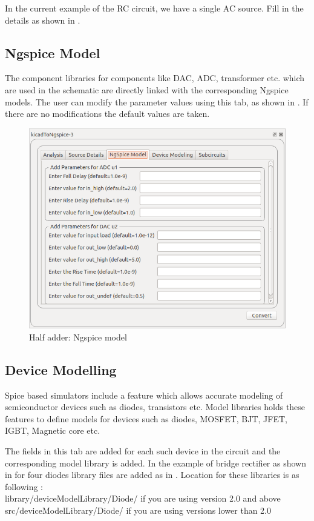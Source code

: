In the current example of the RC circuit, we have a single AC source. Fill in the details as shown in .

\subsection {Ngspice Model} \label{ngspicemodel}
The component libraries for components like DAC, ADC, transformer etc. which are used in the schematic are directly linked with the corresponding Ngspice models. The user can modify the parameter values using this tab, as shown in . If there are no modifications the default values are taken.

\begin{figure}
\centering
\includegraphics[width=\lgfig]{manual_images/ngspice-model.png}
\caption{Half adder: Ngspice model}
\label{ngspicemodel}
\end{figure}

\subsection {Device Modelling} \label{devicemodel}
Spice based simulators include a feature which allows accurate modeling of semiconductor devices such as diodes, transistors etc. Model libraries holds these features to define models for devices such as diodes, MOSFET, BJT, JFET, IGBT, Magnetic core etc.

The fields in this tab are added for each such device in the circuit and the corresponding model library is added. In the example of bridge rectifier as shown in  for four diodes library files are added as in . Location for these libraries is as following : \\
library/deviceModelLibrary/Diode/ if you are using version 2.0 and above \\
src/deviceModelLibrary/Diode/ if you are using versions lower than 2.0

